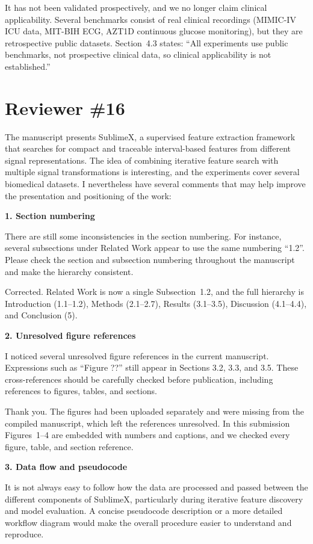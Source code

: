 \documentclass[11pt]{article}
\makeatletter
\newcommand{\rsp}{\par\vspace{0.9em}}
\newcommand{\rc}[1]{\begin{reviewerbox}#1\end{reviewerbox}}
\newcommand{\rcitem}[2]{\begin{reviewerbox}\textbf{#1}\par\smallskip#2\end{reviewerbox}}
\newcommand{\response}[2]{%
  \begin{responsebox}#1%
  \def\@responseitems{#2}%
  \ifx\@responseitems\empty\else\begin{itemize}[nosep,leftmargin=1.2em]#2\end{itemize}\fi
  \end{responsebox}\rsp}
\makeatother
\begin{document}
\response{It has not been validated prospectively, and we no longer claim clinical applicability.
Several benchmarks consist of real clinical recordings (MIMIC-IV ICU data, MIT-BIH ECG, AZT1D
continuous glucose monitoring), but they are retrospective public datasets. Section~4.3 states: ``All
experiments use public benchmarks, not prospective clinical data, so clinical applicability is not
established.''}{}

\section*{Reviewer \#16}

\rc{The manuscript presents SublimeX, a supervised feature extraction framework that searches for
compact and traceable interval-based features from different signal representations. The idea of
combining iterative feature search with multiple signal transformations is interesting, and the
experiments cover several biomedical datasets. I nevertheless have several comments that may help
improve the presentation and positioning of the work:}

\rcitem{1. Section numbering}{There are still some inconsistencies in the section numbering. For
instance, several subsections under Related Work appear to use the same numbering ``1.2''. Please
check the section and subsection numbering throughout the manuscript and make the hierarchy
consistent.}

\response{Corrected. Related Work is now a single Subsection~1.2, and the full hierarchy is
Introduction (1.1--1.2), Methods (2.1--2.7), Results (3.1--3.5), Discussion (4.1--4.4), and
Conclusion (5).}{}

\rcitem{2. Unresolved figure references}{I noticed several unresolved figure references in the
current manuscript. Expressions such as ``Figure ??'' still appear in Sections 3.2, 3.3, and 3.5.
These cross-references should be carefully checked before publication, including references to
figures, tables, and sections.}

\response{Thank you. The figures had been uploaded separately and were missing from the compiled
manuscript, which left the references unresolved. In this submission Figures~1--4 are embedded
with numbers and captions, and we checked every figure, table, and section reference.}{}

\rcitem{3. Data flow and pseudocode}{It is not always easy to follow how the data are processed and
passed between the different components of SublimeX, particularly during iterative feature discovery
and model evaluation. A concise pseudocode description or a more detailed workflow diagram would make
the overall procedure easier to understand and reproduce.}
\end{document}
